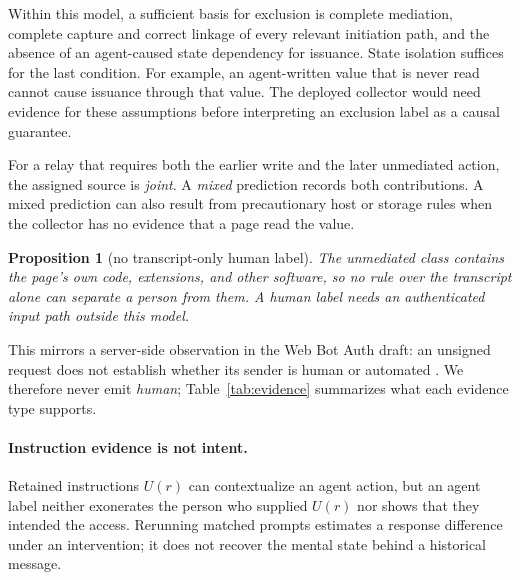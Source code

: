 \documentclass[11pt]{article}
\newtheorem{proposition}{Proposition}
\theoremstyle{definition}
\begin{document}
Within this model, a sufficient basis for exclusion is complete mediation, complete
capture and correct linkage of every relevant initiation path, and the absence of an
agent-caused state dependency for issuance. State isolation suffices for the last
condition. For example, an agent-written value that is never read cannot cause issuance
through that value. The deployed collector would need evidence for these assumptions
before interpreting an exclusion label as a causal guarantee.

For a relay that requires both the earlier write and the later unmediated action, the
assigned source is \emph{joint}. A \emph{mixed} prediction records both contributions. A
mixed prediction can also result from precautionary host or storage rules when the
collector has no evidence that a page read the value.

\begin{proposition}[no transcript-only human label]\label{prop:human}
The unmediated class contains the page's own code, extensions, and other software,
so no rule over the transcript alone can separate a person from them. A
\emph{human} label needs an authenticated input path outside this model.
\end{proposition}
\noindent This mirrors a server-side observation in the Web Bot Auth draft: an
unsigned request does not establish whether its sender is human or automated
\cite{webbotauth}. We therefore never emit \emph{human}; Table~\ref{tab:evidence}
summarizes what each evidence type supports.

\paragraph{Instruction evidence is not intent.} Retained instructions $U(r)$ can
contextualize an agent action, but an agent label neither exonerates the person
who supplied $U(r)$ nor shows that they intended the access. Rerunning matched
prompts estimates a response difference under an intervention; it does not
recover the mental state behind a historical message.
\end{document}
